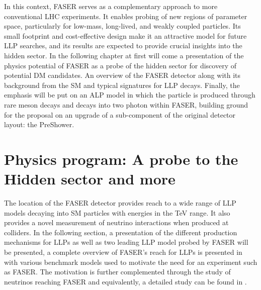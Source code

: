 	In this context, FASER serves as a complementary approach to more conventional LHC experiments. It enables probing of new regions of parameter space, particularly for low-mass, long-lived, and weakly coupled particles. Its small footprint and cost-effective design make it an attractive model for future LLP searches, and its results are expected to provide crucial insights into the hidden sector. In the following chapter at first will come a presentation of the physics potential of FASER as a probe of the hidden sector for discovery of potential DM candidates. An overview of the FASER detector along with its background from the SM and typical signatures for LLP decays. Finally, the emphasis will be put on an ALP model in which the particle is produced through rare meson decays and decays into two photon within FASER, building ground for the proposal on an upgrade of a sub-component of the original detector layout: the PreShower. 
	
	\clearpage
	
	\section{Physics program: A probe to the Hidden sector and more}
	The location of the FASER detector provides reach to a wide range of LLP models decaying into SM particles with energies in the TeV range. It also provides a novel measurement of neutrino interactions when produced at colliders. In the following section, a presentation of the different production mechanisms for LLPs as well as two leading LLP model probed by FASER will be presented, a complete overview of FASER's reach for LLPs is presented in \cite{FASER_LLP} with various benchmark models used to motivate the need for an experiment such as FASER. The motivation is further complemented through the study of neutrinos reaching FASER and equivalently, a detailed study can be found in \cite{neutrino_FASER}.  
	

